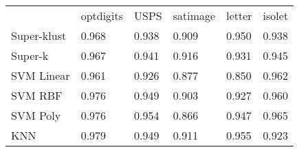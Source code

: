 \begin{tabular}{llllll}
\hline
             & optdigits & USPS  & satimage & letter & isolet \\
 Super-klust & 0.968     & 0.938 & 0.909    & 0.950  & 0.938  \\
 Super-k     & 0.967     & 0.941 & 0.916    & 0.931  & 0.945  \\
 SVM Linear  & 0.961     & 0.926 & 0.877    & 0.850  & 0.962  \\
 SVM RBF     & 0.976     & 0.949 & 0.903    & 0.927  & 0.960  \\
 SVM Poly    & 0.976     & 0.954 & 0.866    & 0.947  & 0.965  \\
 KNN         & 0.979     & 0.949 & 0.911    & 0.955  & 0.923  \\
\hline
\end{tabular}